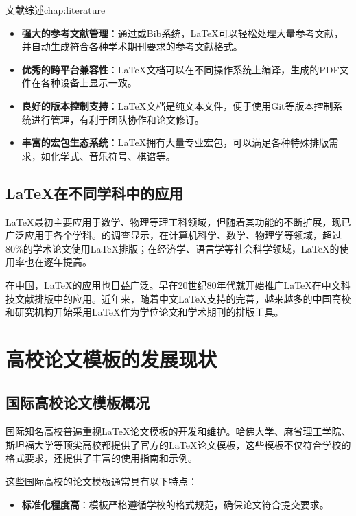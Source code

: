 \begin{cuzchapter}{文献综述}{chap:literature}
\begin{itemize}
		\item \textbf{强大的参考文献管理}：通过或Bib系统，\LaTeX{}可以轻松处理大量参考文献，并自动生成符合各种学术期刊要求的参考文献格式。
		
		\item \textbf{优秀的跨平台兼容性}：\LaTeX{}文档可以在不同操作系统上编译，生成的PDF文件在各种设备上显示一致。
		
		\item \textbf{良好的版本控制支持}：\LaTeX{}文档是纯文本文件，便于使用Git等版本控制系统进行管理，有利于团队协作和论文修订。
		
		\item \textbf{丰富的宏包生态系统}：\LaTeX{}拥有大量专业宏包，可以满足各种特殊排版需求，如化学式、音乐符号、棋谱等。
	\end{itemize}
	
	\subsection{\LaTeX{}在不同学科中的应用}
	
	\LaTeX{}最初主要应用于数学、物理等理工科领域，但随着其功能的不断扩展，现已广泛应用于各个学科。\citet{hls2012jinji}的调查显示，在计算机科学、数学、物理学等领域，超过80\%的学术论文使用\LaTeX{}排版；在经济学、语言学等社会科学领域，\LaTeX{}的使用率也在逐年提高。
	
	在中国，\LaTeX{}的应用也日益广泛。\citet{chen1980zhongguo}早在20世纪80年代就开始推广\LaTeX{}在中文科技文献排版中的应用。近年来，随着中文\LaTeX{}支持的完善，越来越多的中国高校和研究机构开始采用\LaTeX{}作为学位论文和学术期刊的排版工具。
	
	\section{高校论文模板的发展现状}\label{sec:template-status}
	
	\subsection{国际高校论文模板概况}
	
	国际知名高校普遍重视\LaTeX{}论文模板的开发和维护。哈佛大学、麻省理工学院、斯坦福大学等顶尖高校都提供了官方的\LaTeX{}论文模板，这些模板不仅符合学校的格式要求，还提供了丰富的使用指南和示例。
	
	这些国际高校的论文模板通常具有以下特点：
	
	\begin{itemize}
		\item \textbf{标准化程度高}：模板严格遵循学校的格式规范，确保论文符合提交要求。
		

\end{itemize}
\end{cuzchapter}
